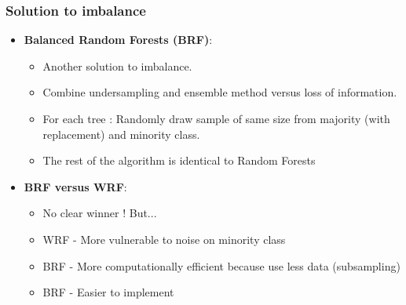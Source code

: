 \documentclass[slidestop,compress,red,mathserif]{beamer}
\begin{document}
\begin{frame}
\frametitle{Solution to imbalance}
\begin{itemize}
  \item[] \textbf{Balanced Random Forests (BRF)}:
    \begin{itemize}
      \item Another solution to imbalance.
      \item Combine undersampling and ensemble method versus loss of information.
      \item For each tree : Randomly draw sample of same size from majority (with replacement) and minority class.
      \item The rest of the algorithm is identical to Random Forests
    \end{itemize}

  \item[] \textbf{BRF versus WRF}:
    \begin{itemize}
      \item No clear winner ! But...
      \item WRF - More vulnerable to noise on minority class
      \item BRF - More computationally efficient because use less data (subsampling)
      \item BRF - Easier to implement
    \end{itemize}

\end{itemize}
\end{frame}
\end{document}
